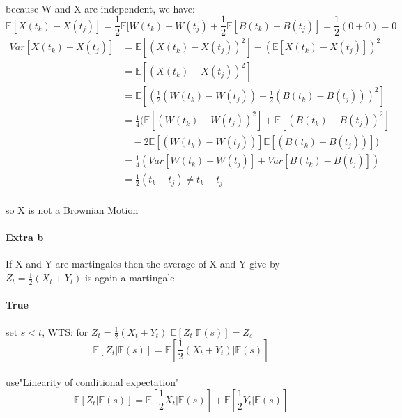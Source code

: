 \documentclass{article}
\begin{document}
\paragraph{}{because W and X are independent, we have: \begin{displaymath}
                                                         \mathbb{E}[X(t_k)-X(t_j)]=\frac{1}{2}\mathbb{E}[W(t_k)-W(t_j)+\frac{1}{2}\mathbb{E}[B(t_k)-B(t_j)]=\frac{1}{2}(0+0)=0
                                                       \end{displaymath}}
\begin{align*}
  Var[X(t_k)-X(t_j)] & =\mathbb{E}[(X(t_k)-X(t_j))^2]-(\mathbb{E}[X(t_k)-X(t_j)])^2\\
   & =\mathbb{E}[(X(t_k)-X(t_j))^2] \\
   & =\mathbb{E}[(\frac{1}{2}(W(t_k)-W(t_j))-\frac{1}{2}(B(t_k)-B(t_j)))^2] \\
   & =\frac{1}{4}(\mathbb{E}[(W(t_k)-W(t_j))^2]+\mathbb{E}[(B(t_k)-B(t_j))^2]\\
   &\quad -2\mathbb{E}[(W(t_k)-W(t_j))]\mathbb{E}[(B(t_k)-B(t_j))])\\
   & =\frac{1}{4}( Var[W(t_k)-W(t_j)]+Var[B(t_k)-B(t_j)])\\
   &=\frac{1}{2}(t_{k}-t_{j})\neq t_{k}-t_{j}
\end{align*}
\paragraph{}{so X is not a Brownian Motion }
\paragraph{Extra b}{If X and Y are martingales then the average of X and Y give by $Z_t=\frac{1}{2}(X_{t}+Y_{t})$ is again a martingale}
\paragraph{True}{set $s<t$, WTS: for $Z_t=\frac{1}{2}(X_{t}+Y_{t})$ $\mathbb{E}[Z_{t}|\mathbb{F}(s)]=Z_{s}$}
\begin{displaymath}
  \mathbb{E}[Z_{t}|\mathbb{F}(s)]=\mathbb{E}[\frac{1}{2}(X_{t}+Y_{t})|\mathbb{F}(s)]
\end{displaymath}
\paragraph{}{use"Linearity of conditional expectation"
\begin{displaymath}
  \mathbb{E}[Z_{t}|\mathbb{F}(s)]=\mathbb{E}[\frac{1}{2}X_{t}|\mathbb{F}(s)]+\mathbb{E}[\frac{1}{2}Y_{t}|\mathbb{F}(s)]
\end{displaymath}}
\end{document}
